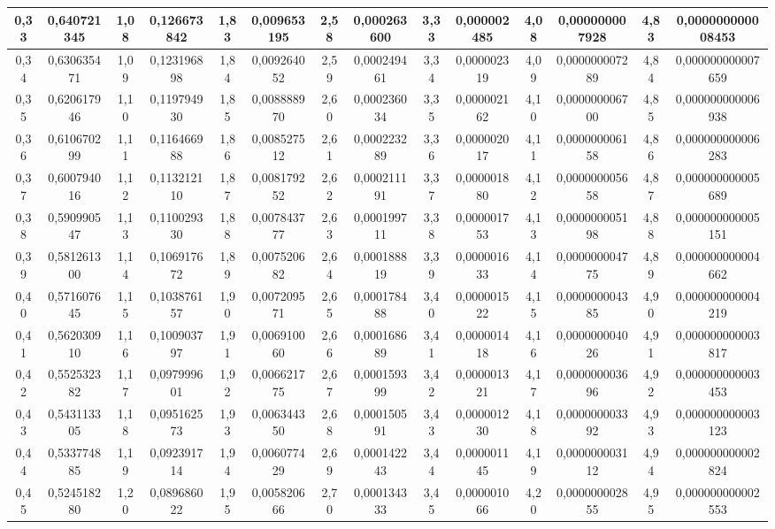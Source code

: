 \documentclass[a4paper,8pt]{article}
\begin{document}
\begin{table}[!ht]
{\begin{tabular}{|c|c||c|c||c|c||c|c||c|c||c|c||c|c||}
        0,33 & 0,640721345 & 1,08 & 0,126673842 & 1,83 & 0,009653195 & 2,58 & 0,000263600 & 3,33 & 0,000002485 & 4,08 & 0,000000007928 & 4,83 & 0,000000000008453 \\ \hline
        0,34 & 0,630635471 & 1,09 & 0,123196898 & 1,84 & 0,009264052 & 2,59 & 0,000249461 & 3,34 & 0,000002319 & 4,09 & 0,000000007289 & 4,84 & 0,000000000007659 \\ \hline
        0,35 & 0,620617946 & 1,10 & 0,119794930 & 1,85 & 0,008888970 & 2,60 & 0,000236034 & 3,35 & 0,000002162 & 4,10 & 0,000000006700 & 4,85 & 0,000000000006938 \\ \hline
        0,36 & 0,610670299 & 1,11 & 0,116466988 & 1,86 & 0,008527512 & 2,61 & 0,000223289 & 3,36 & 0,000002017 & 4,11 & 0,000000006158 & 4,86 & 0,000000000006283 \\ \hline
        0,37 & 0,600794016 & 1,12 & 0,113212110 & 1,87 & 0,008179252 & 2,62 & 0,000211191 & 3,37 & 0,000001880 & 4,12 & 0,000000005658 & 4,87 & 0,000000000005689 \\ \hline
        0,38 & 0,590990547 & 1,13 & 0,110029330 & 1,88 & 0,007843777 & 2,63 & 0,000199711 & 3,38 & 0,000001753 & 4,13 & 0,000000005198 & 4,88 & 0,000000000005151 \\ \hline
        0,39 & 0,581261300 & 1,14 & 0,106917672 & 1,89 & 0,007520682 & 2,64 & 0,000188819 & 3,39 & 0,000001633 & 4,14 & 0,000000004775 & 4,89 & 0,000000000004662 \\ \hline
        0,40 & 0,571607645 & 1,15 & 0,103876157 & 1,90 & 0,007209571 & 2,65 & 0,000178488 & 3,40 & 0,000001522 & 4,15 & 0,000000004385 & 4,90 & 0,000000000004219 \\ \hline
        0,41 & 0,562030910 & 1,16 & 0,100903797 & 1,91 & 0,006910060 & 2,66 & 0,000168689 & 3,41 & 0,000001418 & 4,16 & 0,000000004026 & 4,91 & 0,000000000003817 \\ \hline
        0,42 & 0,552532382 & 1,17 & 0,097999601 & 1,92 & 0,006621775 & 2,67 & 0,000159399 & 3,42 & 0,000001321 & 4,17 & 0,000000003696 & 4,92 & 0,000000000003453 \\ \hline
        0,43 & 0,543113305 & 1,18 & 0,095162573 & 1,93 & 0,006344350 & 2,68 & 0,000150591 & 3,43 & 0,000001230 & 4,18 & 0,000000003392 & 4,93 & 0,000000000003123 \\ \hline
        0,44 & 0,533774885 & 1,19 & 0,092391714 & 1,94 & 0,006077429 & 2,69 & 0,000142243 & 3,44 & 0,000001145 & 4,19 & 0,000000003112 & 4,94 & 0,000000000002824 \\ \hline
        0,45 & 0,524518280 & 1,20 & 0,089686022 & 1,95 & 0,005820666 & 2,70 & 0,000134333 & 3,45 & 0,000001066 & 4,20 & 0,000000002855 & 4,95 & 0,000000000002553 \\ \hline

\end{tabular}}
\end{table}
\end{document}
